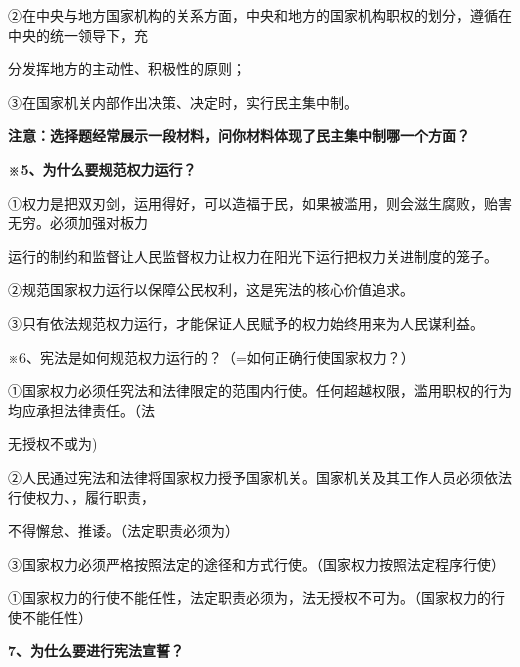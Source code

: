 \documentclass[lang=cn,11pt]{elegantbook}
\newcommand{\daofasym}[1]{{\daofasymbolfont #1}}
\newcommand{\daofasym}[1]{#1}
\begin{document}
\daofasym{②}在中央与地方国家机构的关系方面，中央和地方的国家机构职权的划分，遵循在中央的统一领导下，充\par

分发挥地方的主动性、积极性的原则；\par

\daofasym{③}在国家机关内部作出决策、决定时，实行民主集中制。\par

\textbf{注意：选择题经常展示一段材料，问你材料体现了民主集中制哪一个方面？}\par

\textbf{※5、为什么要规范权力运行？}\par

\daofasym{①}权力是把双刃剑，运用得好，可以造福于民，如果被滥用，则会滋生腐败，贻害无穷。必须加强对板力\par

运行的制约和监督让人民监督权力让权力在阳光下运行把权力关进制度的笼子。\par

\daofasym{②}规范国家权力运行以保障公民权利，这是宪法的核心价值追求。\par

\daofasym{③}只有依法规范权力运行，才能保证人民赋予的权力始终用来为人民谋利益。\par

※6、宪法是如何规范权力运行的？（=如何正确行使国家权力？）\par

\daofasym{①}国家权力必须任究法和法律限定的范围内行使。任何超越权限，滥用职权的行为均应承担法律责任。（法\par

无授权不或为)\par

\daofasym{②}人民通过宪法和法律将国家权力授予国家机关。国家机关及其工作人员必须依法行使权力、，履行职责，\par

不得懈怠、推诿。（法定职责必须为）\par

\daofasym{③}国家权力必须严格按照法定的途径和方式行使。（国家权力按照法定程序行使）\par

\daofasym{①}国家权力的行使不能任性，法定职责必须为，法无授权不可为。（国家权力的行使不能任性）\par

\textbf{7、为仕么要进行宪法宣誓？}\par
\end{document}
